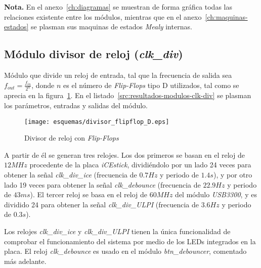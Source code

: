 \textbf{Nota.} En el anexo~\ref{ch:diagramas} se muestran de forma gráfica todas las relaciones existente entre los módulos, mientras que en el anexo~\ref{ch:maquinas-estados} se plasman sus maquinas de estados \emph{Mealy} internas.

\subsection{Módulo divisor de reloj (\emph{clk\_div})}
Módulo que divide un reloj de entrada, tal que la frecuencia de salida sea $f_{out} = \frac{f_{in}}{2^n}$, donde $n$ es el número de \emph{Flip-Flops} tipo D utilizados, tal como se aprecia en la figura~\ref{fig:clk_div_esquema}. En el listado~\ref{src:resultados-modulos-clk-div} se plasman los parámetros, entradas y salidas del módulo.

\begin{figure}[hbt]
    \centering
    \texttt{[image: esquemas/divisor\_flipflop\_D.eps]}
    \caption{Divisor de reloj con \emph{Flip-Flops}}
    \label{fig:clk_div_esquema}
\end{figure}

A partir de él se generan tres relojes. Los dos primeros se basan en el reloj de $12MHz$ procedente de la placa \emph{iCEstick}, dividiéndolo por un lado 24 veces para obtener la señal \emph{clk\_div\_ice} (frecuencia de $0.7Hz$ y periodo de $1.4s$), y por otro lado 19 veces para obtener la señal \emph{clk\_debounce} (frecuencia de $22.9Hz$ y periodo de $43ms$). El tercer reloj se basa en el reloj de $60MHz$ del módulo \emph{USB3300}, y es dividido 24 para obtener la señal \emph{clk\_div\_ULPI} (frecuencia de $3.6Hz$ y periodo de $0.3s$).

Los relojes \emph{clk\_div\_ice} y \emph{clk\_div\_ULPI} tienen la única funcionalidad de comprobar el funcionamiento del sistema por medio de los LEDs integrados en la placa. El reloj \emph{clk\_debounce} es usado en el módulo \emph{btn\_debouncer}, comentado más adelante.



